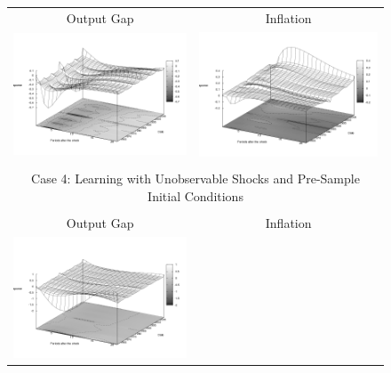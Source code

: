 \begin{figure}
\begin{tabular}{cc}
Output Gap & Inflation \\ 
\includegraphics[scale=0.25]{results_reinit/Output_mpshock_irf3d.png} & 
\includegraphics[scale=0.25]{results_reinit/Inflation_mpshock_irf3d.png} \\ \\ 
\multicolumn{2}{c}{Case 4: Learning with Unobservable Shocks and Pre-Sample Initial Conditions}\\ \\
Output Gap & Inflation \\ 
\includegraphics[scale=0.25]{results_wlsinit/Output_mpshock_irf3d.png} & 

\end{tabular}
\end{figure}
